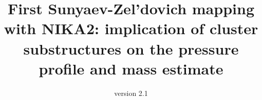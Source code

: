 \documentclass[traditabstract]{aa}
\begin{document}
\def\aj{AJ}%
\def\araa{ARA\&A}%
\def\apj{ApJ}%
\def\apjl{ApJ}%
\def\apjs{ApJS}%
\def\aap{A\&A}%
 \def\aapr{A\&A~Rev.}%
\def\aaps{A\&AS}%
\def\mnras{MNRAS}
\def\ssr{SSRv}
\def\nat{Nature}
\def\jcap{JCAP}

\def\Mgv{M_{\rm g,500}}
\def\Mg{M_{\rm g}}
\def\YX {Y_{\rm X}}
\def\LXv {L_{\rm X,500}}
\def\TX {T_{\rm X}}
\def\fgv {f_{\rm g,500}}
\def\fg  {f_{\rm g}}
\def\kT {{\rm k}T}
\def\ne {n_{\rm e}}
\def\Mv {M_{\rm 500}}
\def \Rv {R_{500}}
\def\keV {\rm keV}
\def\Yv{Y_{500}}


\def\MT {$M$--$T_{\rm X}$}
\def\MYX {$M$--$Y_{\rm X}$}
\def\MMg {$M_{500}$--$M_{\rm g,500}$}
\def\MgT {$M_{\rm g,500}$--$T_{\rm X}$}
\def\MgY {$M_{\rm g,500}$--$Y_{\rm X}$}

\def\msol {{\rm M_{\odot}}}

\def\lesssim{\mathrel{\hbox{\rlap{\hbox{\lower4pt\hbox{$\sim$}}}\hbox{$<$}}}}
\def\gtrsim{\mathrel{\hbox{\rlap{\hbox{\lower4pt\hbox{$\sim$}}}\hbox{$>$}}}}

\def\psz{PSZ2\,G144.83$+$25.11}

\def\xmm{XMM-{\it Newton}}
\def\planck{{\it Planck}} 
\def\chandra{{\it Chandra}}
\def \rosat {\hbox{\it ROSAT}}
\newcommand{\excpres}{{\gwpfont EXCPRES}}
\newcommand{\ma}[1]{\textcolor{red}{{ #1}}}
\title{First Sunyaev-Zel'dovich mapping with NIKA2: implication of cluster substructures on the pressure profile and mass estimate}

\author{version 2.1}



\end{document}
